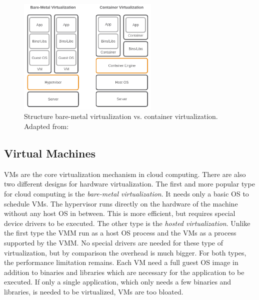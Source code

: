 \begin{figure}[H]
    \centering
    \includegraphics[width=0.6\textwidth]{resources/images/vm_vs_container.png}
    \caption[Structure bare-metal virtualization vs. container virtualization]{Structure bare-metal virtualization vs. container virtualization. Adapted from: \cite[p. 2]{Gallagher:2015}}
    \label{fig:vms_vs_docker}
\end{figure}


\subsection{Virtual Machines}
\acp{VM} are the core virtualization mechanism in cloud computing.
There are also two different designs for hardware virtualization.
The first and more popular type for cloud computing is the \textit{bare-metal virtualization}.
It needs only a basic OS to schedule \acp{VM}.
The hypervisor runs directly on the hardware of the machine without any host \ac{OS} in between.
This is more efficient, but requires special device drivers to be executed.
The other type is the \textit{hosted virtualization}.
Unlike the first type the \ac{VMM} run as a host \ac{OS} process and the \acp{VM} as a process supported by the \ac{VMM}.
No special drivers are needed for these type of virtualization, but by comparison the overhead is much bigger.
For both types, the performance limitation remains.
Each \ac{VM} need a full guest \ac{OS} image in addition to binaries and libraries which are necessary for the application to be executed.\cite[cf.][p. 381]{Pahl:2015}
If only a single application, which only needs a few binaries and libraries, is needed to be virtualized, \acp{VM} are too bloated.


